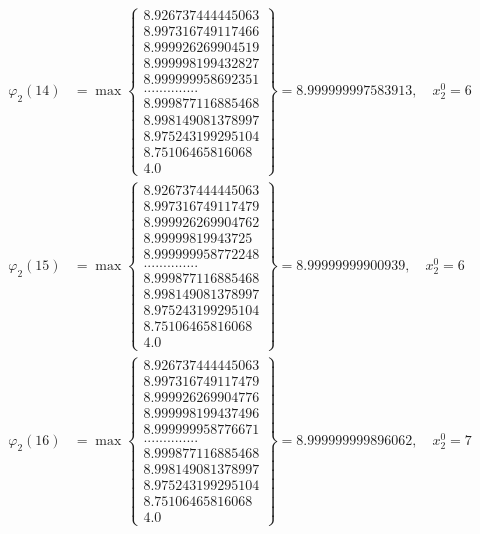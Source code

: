 \documentclass{article}
\begin{document}
\begin{align*}
  
  
  
\varphi_{2}(14) &= \max \left\{ \begin{array}{c}
8.926737444445063 \\
 8.997316749117466 \\
 8.999926269904519 \\
 8.999998199432827 \\
 8.999999958692351 \\
 .............. \\
 8.999877116885468 \\
 8.998149081378997 \\
 8.975243199295104 \\
 8.75106465816068 \\
 4.0
\end{array} \right\} = 8.999999997583913, \quad x_{2}^0 = 6\\
  
  
  
  
\varphi_{2}(15) &= \max \left\{ \begin{array}{c}
8.926737444445063 \\
 8.997316749117479 \\
 8.999926269904762 \\
 8.99999819943725 \\
 8.999999958772248 \\
 .............. \\
 8.999877116885468 \\
 8.998149081378997 \\
 8.975243199295104 \\
 8.75106465816068 \\
 4.0
\end{array} \right\} = 8.99999999900939, \quad x_{2}^0 = 6\\
  
  
  
  
\varphi_{2}(16) &= \max \left\{ \begin{array}{c}
8.926737444445063 \\
 8.997316749117479 \\
 8.999926269904776 \\
 8.999998199437496 \\
 8.999999958776671 \\
 .............. \\
 8.999877116885468 \\
 8.998149081378997 \\
 8.975243199295104 \\
 8.75106465816068 \\
 4.0
\end{array} \right\} = 8.999999999896062, \quad x_{2}^0 = 7\\
  

\end{align*}
\end{document}
